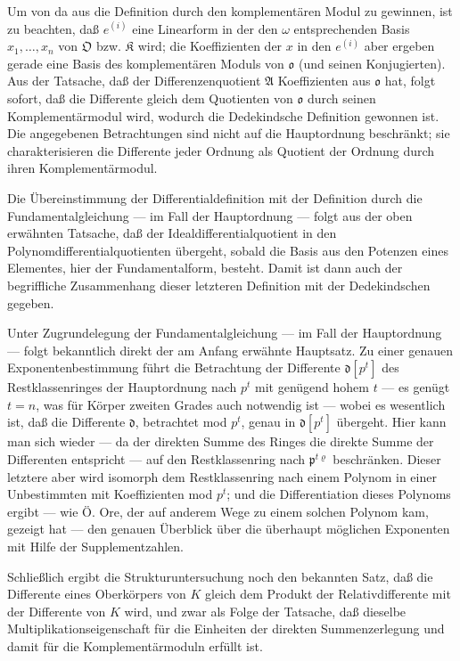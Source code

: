 Um von da aus die Definition durch den komplementären Modul zu gewinnen, ist zu beachten, daß $e^{(i)}$ eine Linearform in der den $\omega$ entsprechenden Basis $x_1,\ldots,x_n$ von $\mathfrak O$ bzw. $\mathfrak K$ wird; die Koeffizienten der $x$ in den $e^{(i)}$ aber ergeben gerade eine Basis des komplementären Moduls von $\mathfrak o$ (und seinen Konjugierten). Aus der Tatsache, daß der Differenzenquotient $\mathfrak A$ Koeffizienten aus $\mathfrak o$ hat, folgt sofort, daß die Differente gleich dem Quotienten von $\mathfrak o$ durch seinen Komplementärmodul wird, wodurch die Dedekindsche Definition gewonnen ist. Die angegebenen Betrachtungen sind nicht auf die Hauptordnung beschränkt; sie charakterisieren die Differente jeder Ordnung als Quotient der Ordnung durch ihren Komplementärmodul.

Die Übereinstimmung der Differentialdefinition mit der Definition durch die Fundamentalgleichung --- im Fall der Hauptordnung --- folgt aus der oben erwähnten Tatsache, daß der Idealdifferentialquotient in den Polynomdifferentialquotienten übergeht, sobald die Basis aus den Potenzen eines Elementes, hier der Fundamentalform, besteht. Damit ist dann auch der begriffliche Zusammenhang dieser letzteren Definition mit der Dedekindschen gegeben.

Unter Zugrundelegung der Fundamentalgleichung --- im Fall der Hauptordnung --- folgt bekanntlich direkt der am Anfang erwähnte Hauptsatz. Zu einer genauen Exponentenbestimmung führt die Betrachtung der Differente $\mathfrak d[p^t]$ des Restklassenringes der Hauptordnung nach $p^t$ mit genügend hohem $t$ --- es genügt $t=n$, was für Körper zweiten Grades auch notwendig ist --- wobei es wesentlich ist, daß die Differente $\mathfrak d$, betrachtet mod $p^t$, genau in $\mathfrak d[p^t]$ übergeht. Hier kann man sich wieder --- da der direkten Summe des Ringes die direkte Summe der Differenten entspricht --- auf den Restklassenring nach $\mathfrak p^{t\varrho}$ beschränken. Dieser letztere aber wird isomorph dem Restklassenring nach einem Polynom in einer Unbestimmten mit Koeffizienten mod $p^t$; und die Differentiation dieses Polynoms ergibt --- wie Ö. Ore, der auf anderem Wege zu einem solchen Polynom kam, gezeigt hat --- den genauen Überblick über die überhaupt möglichen Exponenten mit Hilfe der Supplementzahlen.

Schließlich ergibt die Strukturuntersuchung noch den bekannten Satz, daß die Differente eines Oberkörpers von $K$ gleich dem Produkt der Relativdifferente mit der Differente von $K$ wird, und zwar als Folge der Tatsache, daß dieselbe Multiplikationseigenschaft für die Einheiten der direkten Summenzerlegung und damit für die Komplementärmoduln erfüllt ist.

